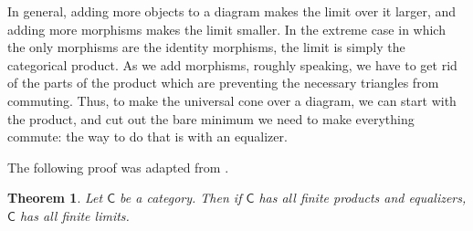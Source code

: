 \documentclass[a4paper,10pt]{scrreprt}
\theoremstyle{definition}
\theoremstyle{plain}
\newtheorem{theorem}{Theorem}[section]
\theoremstyle{remark}
\begin{document}
In general, adding more objects to a diagram makes the limit over it larger, and adding more morphisms makes the limit smaller. In the extreme case in which the only morphisms are the identity morphisms, the limit is simply the categorical product. As we add morphisms, roughly speaking, we have to get rid of the parts of the product which are preventing the necessary triangles from commuting. Thus, to make the universal cone over a diagram, we can start with the product, and cut out the bare minimum we need to make everything commute: the way to do that is with an equalizer.

The following proof was adapted from \cite{awodey-category-theory}. 
\begin{theorem}
  \label{thm:criterionforfinitelimits}
  Let $\mathsf{C}$ be a category. Then if $\mathsf{C}$ has all finite products and equalizers, $\mathsf{C}$ has all finite limits.

\end{theorem}
\end{document}

